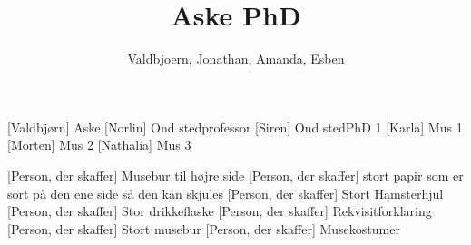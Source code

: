 \documentclass[a4paper,11pt]{article}
\title{Aske PhD}
\author{Valdbjoern, Jonathan, Amanda, Esben}
\begin{document}
\maketitle

\begin{roles}
    [Valdbjørn] Aske
    [Norlin] Ond stedprofessor
    [Siren] Ond stedPhD 1
    [Karla] Mus 1
    [Morten] Mus 2
    [Nathalia] Mus 3
\end{roles}

\begin{props}
    [Person, der skaffer] Musebur til højre side
    [Person, der skaffer] stort papir som er sort på den ene side så den kan skjules
    [Person, der skaffer] Stort Hamsterhjul
    [Person, der skaffer] Stor drikkeflaske
    [Person, der skaffer] Rekvisitforklaring
    [Person, der skaffer] Stort musebur
    [Person, der skaffer] Musekostumer
\end{props}
\end{document}
